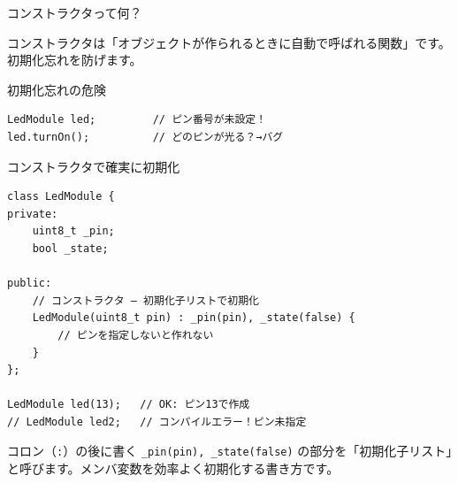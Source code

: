 \begin{qabox}{コンストラクタって何？}

コンストラクタは「オブジェクトが作られるときに自動で呼ばれる関数」です。初期化忘れを防げます。

\begin{badexample}{初期化忘れの危険}
\begin{lstlisting}
LedModule led;         // ピン番号が未設定！
led.turnOn();          // どのピンが光る？→バグ
\end{lstlisting}
\end{badexample}

\begin{goodexample}{コンストラクタで確実に初期化}
\begin{lstlisting}
class LedModule {
private:
    uint8_t _pin;
    bool _state;

public:
    // コンストラクタ — 初期化子リストで初期化
    LedModule(uint8_t pin) : _pin(pin), _state(false) {
        // ピンを指定しないと作れない
    }
};

LedModule led(13);   // OK: ピン13で作成
// LedModule led2;   // コンパイルエラー！ピン未指定
\end{lstlisting}
\end{goodexample}

コロン（\texttt{:}）の後に書く \texttt{\_pin(pin), \_state(false)} の部分を「初期化子リスト」と呼びます。メンバ変数を効率よく初期化する書き方です。
\end{qabox}

